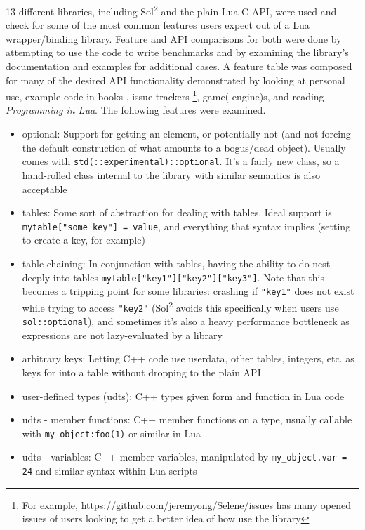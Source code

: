 \documentclass[conference,compsoc]{IEEEtran}
\newcommand{\soltwo}{Sol\textsuperscript{2}}
\begin{document}
13 different libraries, including \soltwo{} and the plain Lua C API, were used and check for some of the most common features users expect out of a Lua wrapper/binding library. Feature and API comparisons for both were done by attempting to use the code to write benchmarks and by examining the library's documentation and examples for additional cases. A feature table was composed for many of the desired API functionality demonstrated by looking at personal use, example code in books \cite{lua-game-cryengine}, issue trackers \footnote{For example, \url{https://github.com/jeremyong/Selene/issues} has many opened issues of users looking to get a better idea of how use the library}, game( engine)s\cite{amulet}, and reading \emph{Programming in Lua}\cite{lua-programming}. The following features were examined.

\begin{itemize}
	\item[1] optional: Support for getting an element, or potentially not (and not forcing the default construction of what amounts to a bogus/dead object). Usually comes with \lstinline|std(::experimental)::optional|. It's a fairly new class, so a hand-rolled class internal to the library with similar semantics is also acceptable
	\item[2] tables: Some sort of abstraction for dealing with tables. Ideal support is \lstinline|mytable["some_key"] = value|, and everything that syntax implies (setting to create a key, for example)
	\item[3] table chaining: In conjunction with tables, having the ability to do nest deeply into tables \lstinline|mytable["key1"]["key2"]["key3"]|. Note that this becomes a tripping point for some libraries: crashing if \lstinline|"key1"| does not exist while trying to access \lstinline|"key2"| (\soltwo{} avoids this specifically when users use \lstinline|sol::optional|), and sometimes it's also a heavy performance bottleneck as expressions are not lazy-evaluated by a library
	\item[4] arbitrary keys: Letting C++ code use userdata, other tables, integers, etc. as keys for into a table without dropping to the plain API
	\item[5] user-defined types (udts): C++ types given form and function in Lua code
	\item[6] udts - member functions: C++ member functions on a type, usually callable with \lstinline|my_object:foo(1)| or similar in Lua
	\item[7] udts - variables: C++ member variables, manipulated by \lstinline|my_object.var = 24| and similar syntax within Lua scripts

\end{itemize}
\end{document}
